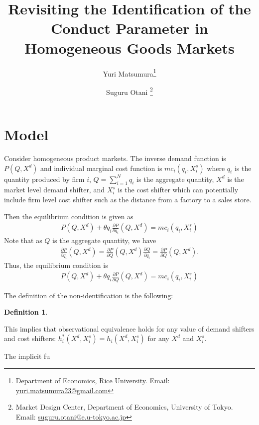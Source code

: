\documentclass[11pt, a4paper]{article}
\title{Revisiting the Identification of the Conduct Parameter in Homogeneous Goods Markets}
\author{Yuri Matsumura\thanks{Department of Economics, Rice University. Email: \href{mailto:yuri.matsumura23@gmail.com}{yuri.matsumura23@gmail.com}} \and Suguru Otani \thanks{Market Design Center, Department of Economics, University of Tokyo. Email: \href{mailto:suguru.otani@e.u-tokyo.ac.jp}{suguru.otani@e.u-tokyo.ac.jp}
}}
\newtheorem{definition}{Definition}
\begin{document}
\section{Model}


Consider homogeneous product markets.
The inverse demand function is $P(Q, X^{d})$ and individual marginal cost function is $mc_i(q_i, X^{s}_{i})$ where $q_i$ is the quantity produced by firm $i$, $Q=\sum_{i=1}^{N}q_i$ is the aggregate quantity, $X^{d}$ is the market level demand shifter, and $X^{s}_i$ is the cost shifter which can potentially include firm level cost shifter such as the distance from a factory to a sales store.

Then the equilibrium condition is given as
\begin{align}
    P(Q, X^{d}) + \theta q_i \frac{\partial P}{\partial q_i}(Q, X^{d}) = mc_i(q_i, X^{s}_i)
\end{align}
Note that as $Q$ is the aggregate quantity, we have
\begin{align}
    \frac{\partial P}{\partial q_i}(Q, X^{d}) = \frac{\partial P}{\partial Q}(Q, X^{d})\frac{\partial Q}{\partial q_i} = \frac{\partial P}{\partial Q}(Q, X^{d}).
\end{align}
Thus, the equilibrium condition is
\begin{align}
    P(Q, X^{d}) + \theta q_i \frac{\partial P}{\partial Q}(Q, X^{d}) = mc_i(q_i, X^{s}_i)
\end{align}

The definition of the non-identification is the following:
\begin{definition}
    
\end{definition}
 

This implies that observational equivalence holds for any value of demand shifters and cost shifters: $h_i^{*}(X^{d}, X^{s}_i) = h_i(X^{d}, X^{s}_i)$ for any $X^{d}$ and $X^{s}_i$.

The implicit fu
\end{document}
